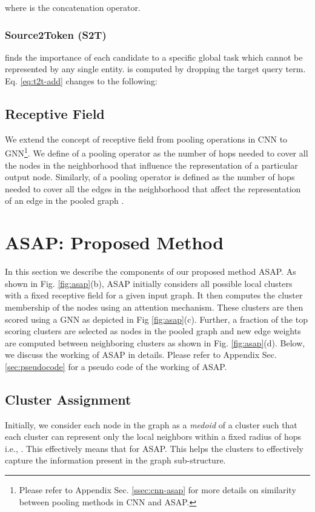 \documentclass[letterpaper]{article} \usepackage{aaai20}  \usepackage{times}  \usepackage{helvet} \usepackage{courier}  \usepackage[hyphens]{url}  \usepackage{graphicx} \urlstyle{rm} \def\UrlFont{\rm}  \usepackage{graphicx}  \frenchspacing  \setlength{\pdfpagewidth}{8.5in}  \setlength{\pdfpageheight}{11in}
\begin{document}
where  is the concatenation operator.

\subsubsection{Source2Token (S2T)} finds the importance of each candidate to a specific global task which cannot be represented by any single entity.  is computed by dropping the target query term. Eq. \eqref{eq:t2t-add} changes to the following:


\subsection{Receptive Field} 



We extend the concept of receptive field  from pooling operations in CNN  to GNN\footnote{Please refer to Appendix Sec. \ref{ssec:cnn-asap} for more details on similarity between pooling methods in CNN and ASAP.}. We define  of a pooling operator as the number of hops needed to cover all the nodes in the neighborhood that influence the representation of a particular output node. Similarly,  of a pooling operator is defined as the number of hops needed to cover all the edges in the neighborhood that affect the representation of an edge in the pooled graph .


%
 
\section{ASAP: Proposed Method}
\label{sec:proposed-method}


In this section we describe the components of our proposed method ASAP. As shown in Fig. \ref{fig:asap}(b), ASAP initially considers all possible local clusters with a fixed receptive field for a given input graph. It then computes the cluster membership of the nodes using an attention mechanism. These clusters are then scored using a GNN as depicted in Fig \ref{fig:asap}(c). Further, a fraction of the top scoring clusters are selected as nodes in the pooled graph and new edge weights are computed between neighboring clusters as shown in Fig. \ref{fig:asap}(d). Below, we discuss the working of ASAP in details. Please refer to Appendix Sec. \ref{sec:pseudocode} for a pseudo code of the working of ASAP.


\subsection{Cluster Assignment}
\label{ssec:cluster-assignment}
Initially, we consider each node  in the graph as a \textit{medoid} of a cluster  such that each cluster can represent only the local neighbors  within a fixed radius of  hops i.e., . This effectively means that  for ASAP. This helps the clusters to effectively capture the information present in the graph sub-structure.
\end{document}

